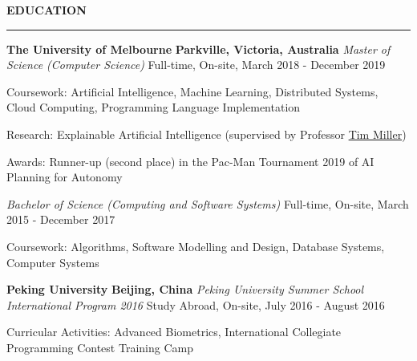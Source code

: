 \documentclass{cv}
\begin{document}

\textbf{\uppercase{Education}}
\sectionlineskip
\hrule height 0.6pt
\begin{list}{}{\setlength{\leftmargin}{0pt}}
\item
    \textbf{The University of Melbourne} \hfill \textbf{Parkville, Victoria, Australia}%
    \vspace{1.0pt} \newline
    {\textit{Master of Science (Computer Science)}} \hfill {Full-time, On-site, March 2018 - December 2019}%
    \begin{list}{\raisebox{2.0pt}{\tiny$\bullet$}\space}{\setlength{\leftmargin}{11.2pt}}
        \itemsep -5.0pt \vspace{-4.0pt}
        \item Coursework: Artificial Intelligence, Machine Learning, Distributed Systems, Cloud Computing, Programming Language Implementation
        \item Research: Explainable Artificial Intelligence (supervised by Professor \href{https://eecs.uq.edu.au/profile/9477/tim-miller}{Tim Miller})
        \item Awards: Runner-up (second place) in the Pac-Man Tournament 2019 of AI Planning for Autonomy
    \end{list}
    \vspace{-3.0pt}
    {\textit{Bachelor of Science (Computing and Software Systems)}} \hfill {Full-time, On-site, March 2015 - December 2017}%
    \begin{list}{\raisebox{2.0pt}{\tiny$\bullet$}\space}{\setlength{\leftmargin}{11.2pt}}
        \itemsep -5.0pt \vspace{-4.0pt}
        \item Coursework: Algorithms, Software Modelling and Design, Database Systems, Computer Systems
    \end{list}
\item
    \textbf{Peking University} \hfill \textbf{Beijing, China}%
    \vspace{1.0pt} \newline 
    {\textit{Peking University Summer School International Program 2016}} \hfill {Study Abroad, On-site, July 2016 - August 2016}%
    \begin{list}{\raisebox{2.0pt}{\tiny$\bullet$}\space}{\setlength{\leftmargin}{11.2pt}}
        \itemsep -5.0pt \vspace{-4.0pt}
        \item Curricular Activities: Advanced Biometrics, International Collegiate Programming Contest Training Camp
    \end{list}
\end{list}
\end{document}
